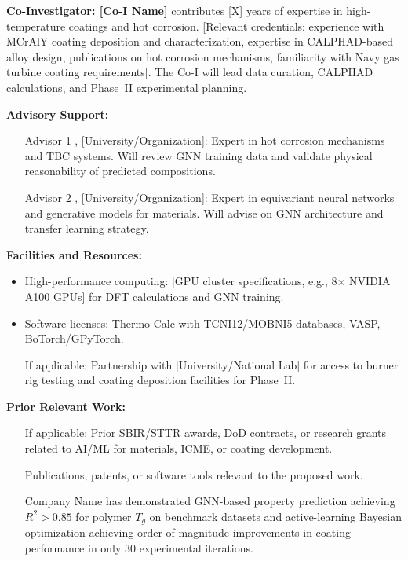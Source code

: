 \documentclass[11pt,letterpaper]{article}
\begin{document}
\textbf{Co-Investigator: [Co-I Name]} contributes [X] years of expertise in high-temperature coatings and hot corrosion. [Relevant credentials: experience with MCrAlY coating deposition and characterization, expertise in CALPHAD-based alloy design, publications on hot corrosion mechanisms, familiarity with Navy gas turbine coating requirements]. The Co-I will lead data curation, CALPHAD calculations, and Phase~II experimental planning.

\textbf{Advisory Support:}
\begin{itemize}[nosep]
  \item [Advisor 1], [University/Organization]: Expert in hot corrosion mechanisms and TBC systems. Will review GNN training data and validate physical reasonability of predicted compositions.
  \item [Advisor 2], [University/Organization]: Expert in equivariant neural networks and generative models for materials. Will advise on GNN architecture and transfer learning strategy.
\end{itemize}

\textbf{Facilities and Resources:}
\begin{itemize}[nosep]
  \item High-performance computing: [GPU cluster specifications, e.g., 8$\times$ NVIDIA A100 GPUs] for DFT calculations and GNN training.
  \item Software licenses: Thermo-Calc with TCNI12/MOBNI5 databases, VASP, BoTorch/GPyTorch.
  \item [If applicable:] Partnership with [University/National Lab] for access to burner rig testing and coating deposition facilities for Phase~II.
\end{itemize}

\textbf{Prior Relevant Work:}
\begin{itemize}[nosep]
  \item [If applicable: Prior SBIR/STTR awards, DoD contracts, or research grants related to AI/ML for materials, ICME, or coating development.]
  \item [Publications, patents, or software tools relevant to the proposed work.]
  \item [Company Name] has demonstrated GNN-based property prediction achieving $R^2 > 0.85$ for polymer $T_g$ on benchmark datasets and active-learning Bayesian optimization achieving order-of-magnitude improvements in coating performance in only 30 experimental iterations.
\end{itemize}
\end{document}
